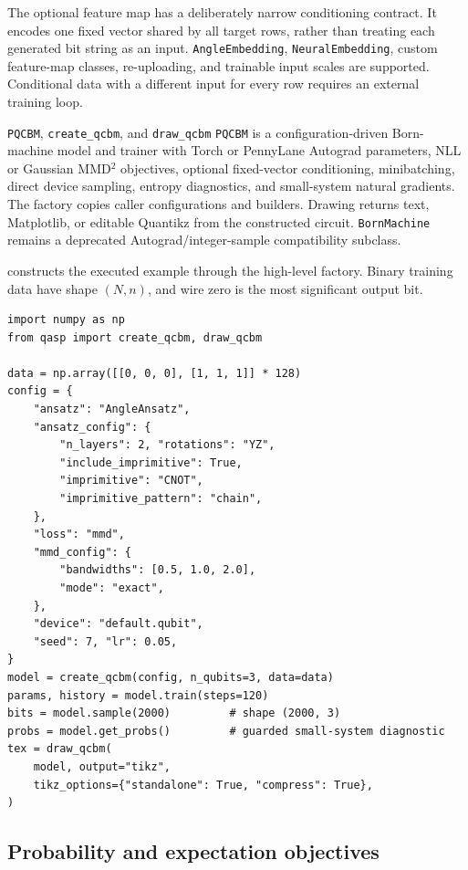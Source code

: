 \documentclass[10pt]{article}
\newcommand{\code}[1]{\texttt{#1}}
\begin{document}
The optional feature map has a deliberately narrow conditioning contract.  It
encodes one fixed vector shared by all target rows, rather than treating each
generated bit string as an input.  \code{AngleEmbedding},
\code{NeuralEmbedding}, custom feature-map classes, re-uploading, and
trainable input scales are supported.  Conditional data with a different input
for every row requires an external training loop.

\begin{qaspfeature}{\code{PQCBM}, \code{create\_qcbm}, and \code{draw\_qcbm}}
\code{PQCBM} is a configuration-driven Born-machine model and trainer with
Torch or PennyLane Autograd parameters, NLL or Gaussian MMD$^2$ objectives,
optional fixed-vector conditioning, minibatching, direct device sampling,
entropy diagnostics, and small-system natural gradients.  The factory copies
caller configurations and builders.  Drawing returns text, Matplotlib, or
editable Quantikz from the constructed circuit.  \code{BornMachine} remains a
deprecated Autograd/integer-sample compatibility subclass.
\end{qaspfeature}

 constructs the executed example through the high-level
factory.  Binary training data have shape $(N,n)$, and wire zero is the most
significant output bit.

\begin{lstlisting}[caption={Constructing, training, sampling, and drawing a
three-qubit QASP Born machine.},label={lst:genlearn}]
import numpy as np
from qasp import create_qcbm, draw_qcbm

data = np.array([[0, 0, 0], [1, 1, 1]] * 128)
config = {
    "ansatz": "AngleAnsatz",
    "ansatz_config": {
        "n_layers": 2, "rotations": "YZ",
        "include_imprimitive": True,
        "imprimitive": "CNOT",
        "imprimitive_pattern": "chain",
    },
    "loss": "mmd",
    "mmd_config": {
        "bandwidths": [0.5, 1.0, 2.0],
        "mode": "exact",
    },
    "device": "default.qubit",
    "seed": 7, "lr": 0.05,
}
model = create_qcbm(config, n_qubits=3, data=data)
params, history = model.train(steps=120)
bits = model.sample(2000)         # shape (2000, 3)
probs = model.get_probs()         # guarded small-system diagnostic
tex = draw_qcbm(
    model, output="tikz",
    tikz_options={"standalone": True, "compress": True},
)
\end{lstlisting}

\subsection{Probability and expectation objectives}
\label{sec:genlearn-mmd}
\end{document}
